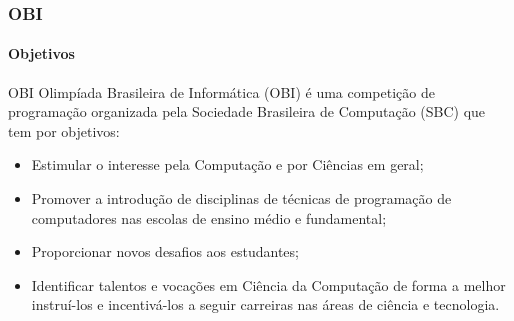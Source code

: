 \begin{frame}
	\frametitle{OBI}
	\framesubtitle{Objetivos}
	
	\begin{block:concept}{OBI}
		Olimpíada Brasileira de Informática (OBI) é uma competição de programação
		organizada pela Sociedade Brasileira de Computação (SBC) que tem por
		objetivos:
		
		\begin{itemize}
			\item Estimular o interesse pela Computação e por Ciências em geral;
			
			\item Promover a introdução de disciplinas de técnicas de programação de
			computadores nas escolas de ensino médio e fundamental;
			
			\item Proporcionar novos desafios aos estudantes;
			
			\item Identificar talentos e vocações em Ciência da Computação de forma a
			melhor instruí-los e incentivá-los a seguir carreiras nas áreas de 
			ciência e tecnologia. 
		\end{itemize}
	\end{block:concept}
\end{frame}


